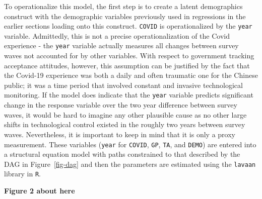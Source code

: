 \documentclass[
  letterpaper,
  DIV=11,
  numbers=noendperiod]{scrartcl}
\begin{document}
To operationalize this model, the first step is to create a latent
demographics construct with the demographic variables previously used in
regressions in the earlier sections loading onto this construct.
\texttt{COVID} is operationalized by the \texttt{year} variable.
Admittedly, this is not a precise operationalization of the Covid
experience - the \texttt{year} variable actually measures all changes
between survey waves not accounted for by other variables. With respect
to government tracking acceptance attitudes, however, this assumption
can be justified by the fact that the Covid-19 experience was both a
daily and often traumatic one for the Chinese public; it was a time
period that involved constant and invasive technological monitoring. If
the model does indicate that the \texttt{year} variable predicts
significant change in the response variable over the two year difference
between survey waves, it would be hard to imagine any other plausible
cause as no other large shifts in technological control existed in the
roughly two years between survey waves. Nevertheless, it is important to
keep in mind that it is only a proxy measurement. These variables
(\texttt{year} for \texttt{COVID}, \texttt{GP}, \texttt{TA}, and
\texttt{DEMO}) are entered into a structural equation model with paths
constrained to that described by the DAG in Figure~\ref{fig-dag} and
then the parameters are estimated using the \texttt{lavaan} library in
\texttt{R}.

\textbf{Figure 2 about here}
\end{document}

